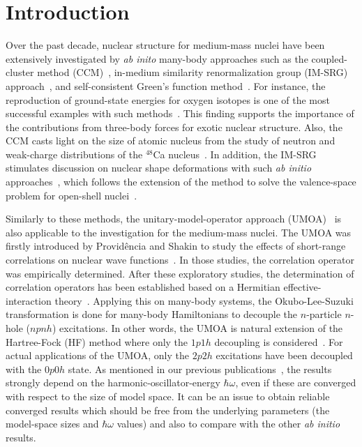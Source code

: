 \documentclass[aps,prc, dvips, twocolumn,groupedaddress,showkeys,showpacs,floatfix,superscriptaddress]{revtex4-1}
\newcommand{\<}{\langle}
\renewcommand{\>}{\rangle}
\begin{document}
\section{\label{sec:intro}Introduction}
Over the past decade, nuclear structure for medium-mass nuclei
 have been extensively investigated by {\it ab inito} many-body approaches such as
 the coupled-cluster method (CCM)~\cite{Wloch:2005,Hagen:2007,Hagen:2008,Hagen:2010,
Hagen:2012-1,Hagen:2012-2,Binder:2013,Hagen:2014,Binder:2015},
in-medium similarity renormalization group (IM-SRG)
 approach~\cite{Hergert:2013-1,Hergert:2013-2,Hergert:2014},
and self-consistent Green's function method~\cite{Barbieri:2009,Cipollone:2013,Soma:2014}.
For instance, the reproduction of ground-state energies for oxygen isotopes is one of the most
 successful examples with such methods~\cite{Hagen:2012-1, Hergert:2013-2, Cipollone:2013}.
This finding supports the importance of the contributions
from three-body forces for exotic nuclear structure.
Also, the CCM casts light on the size of atomic nucleus from the study of
neutron and weak-charge distributions of the $^{48}$Ca nucleus~\cite{Hagen:2015gr}.
In addition, the IM-SRG stimulates discussion on nuclear shape deformations
with such {\it ab initio} approaches~\cite{Stroberg:2016jf},
which follows the extension of the method to solve the valence-space problem
for open-shell nuclei~\cite{Tsukiyama:2012dw,Bogner:2014ib}.

Similarly to these methods, the unitary-model-operator approach (UMOA)~\cite{Suzuki:1994, Fujii:2004, Fujii:2009}
 is also applicable to the investigation for the medium-mass nuclei.
The UMOA was firstly introduced by Provid\^encia and Shakin to study the effects of
  short-range correlations on nuclear wave functions~\cite{Providencia:1964, Shakin:1967}.
In those studies, the correlation operator was empirically determined.
After these exploratory studies, the determination of correlation operators has been established
 based on a Hermitian effective-interaction theory~\cite{Suzuki:1986, Suzuki:1987}.
Applying this on many-body systems,
 the Okubo-Lee-Suzuki transformation is done for many-body Hamiltonians to decouple the $n$-particle $n$-hole ($npnh$) excitations.
In other words, the UMOA is natural extension of the Hartree-Fock (HF) method
where only the $1p1h$ decoupling is considered~\cite{Suzuki:1988}.
For actual applications of the UMOA, only the $2p2h$ excitations have been decoupled with the $0p0h$ state.
As mentioned in our previous publications~\cite{Miyagi:2014, Miyagi:2015},
the results strongly depend on the harmonic-oscillator-energy $\hbar\omega$,
 even if these are converged with respect to the size of model space.
It can be an issue to obtain reliable converged results
which should be free from the underlying parameters (the model-space sizes and $\hbar\omega$ values)
and also to compare with the other {\it ab initio} results.
\end{document}
